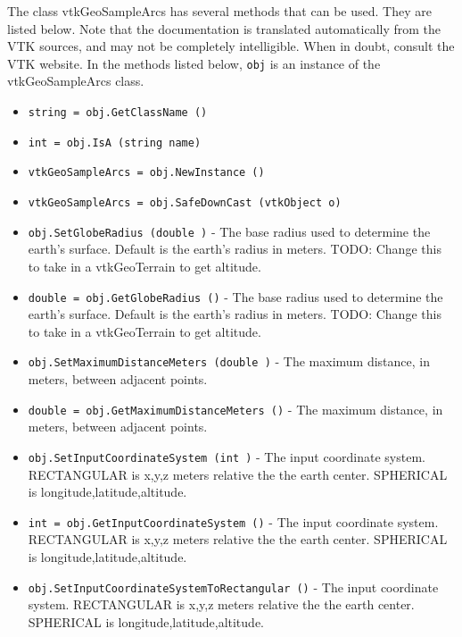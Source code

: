 The class vtkGeoSampleArcs has several methods that can be used.
  They are listed below.
Note that the documentation is translated automatically from the VTK sources,
and may not be completely intelligible.  When in doubt, consult the VTK website.
In the methods listed below, \verb|obj| is an instance of the vtkGeoSampleArcs class.
\begin{itemize}
\item  \verb|string = obj.GetClassName ()|

\item  \verb|int = obj.IsA (string name)|

\item  \verb|vtkGeoSampleArcs = obj.NewInstance ()|

\item  \verb|vtkGeoSampleArcs = obj.SafeDownCast (vtkObject o)|

\item  \verb|obj.SetGlobeRadius (double )| -  The base radius used to determine the earth's surface.
 Default is the earth's radius in meters.
 TODO: Change this to take in a vtkGeoTerrain to get altitude.

\item  \verb|double = obj.GetGlobeRadius ()| -  The base radius used to determine the earth's surface.
 Default is the earth's radius in meters.
 TODO: Change this to take in a vtkGeoTerrain to get altitude.

\item  \verb|obj.SetMaximumDistanceMeters (double )| -  The maximum distance, in meters, between adjacent points.

\item  \verb|double = obj.GetMaximumDistanceMeters ()| -  The maximum distance, in meters, between adjacent points.

\item  \verb|obj.SetInputCoordinateSystem (int )| -  The input coordinate system.
 RECTANGULAR is x,y,z meters relative the the earth center.
 SPHERICAL is longitude,latitude,altitude.

\item  \verb|int = obj.GetInputCoordinateSystem ()| -  The input coordinate system.
 RECTANGULAR is x,y,z meters relative the the earth center.
 SPHERICAL is longitude,latitude,altitude.

\item  \verb|obj.SetInputCoordinateSystemToRectangular ()| -  The input coordinate system.
 RECTANGULAR is x,y,z meters relative the the earth center.
 SPHERICAL is longitude,latitude,altitude.


\end{itemize}
